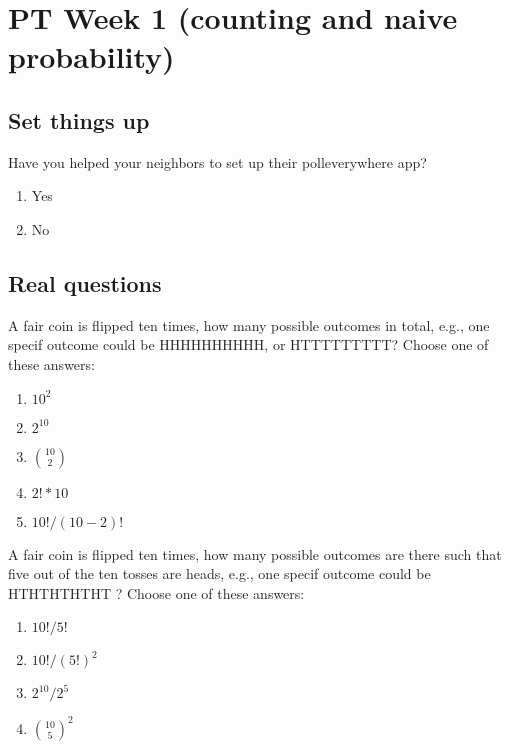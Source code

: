 \documentclass[poll_tutorial_format]{subfiles}
\begin{document}
	\maketitle
		\setcounter{section}{0}
	\section{PT Week 1 (counting and naive probability)}
	
	\subsection{Set things up}
	\label{sec:set-things-up}
	
	
	
	\setcounter{theorem}{-1}
	\begin{exercise}
		Have you helped your neighbors to set up their polleverywhere app?
		\begin{enumerate}
			\item Yes
			\item No
		\end{enumerate}
	\end{exercise}
	
	\subsection{Real questions}
	\label{sec:start-real-questions pt week1}
	\begin{exercise}
		A fair coin is flipped ten times, how many possible outcomes in total, e.g., one specif outcome could be HHHHHHHHHH, or HTTTTTTTTT?		 		Choose one of these answers: 
		\begin{enumerate}
			\item $10^2$
			\item $2^{10}$
			\item ${10\choose 2}$
			\item $2! * 10$
			\item $10!/(10-2)!$
		\end{enumerate}
	\end{exercise}
	
	
	\begin{exercise}
A fair coin is flipped ten times, how many possible outcomes are there such that five out of the ten tosses are heads, e.g., one specif outcome could be HTHTHTHTHT ?				 		Choose one of these answers:
		\begin{enumerate}
			\item $10!/5!$
			\item $10!/(5!)^2$
			\item $2^{10}/2^{5}$ 
			\item ${10 \choose 5}^2$
		\end{enumerate}
	\end{exercise}
\end{document}
